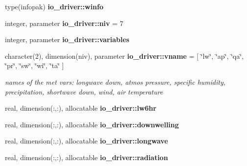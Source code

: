 \begin{DoxyCompactItemize}
\item 
\hypertarget{namespaceio__driver_af047ea740ca0d848d153f630afa40bda}{}type(infopak) {\bfseries io\+\_\+driver\+::winfo}\label{namespaceio__driver_af047ea740ca0d848d153f630afa40bda}

\item 
\hypertarget{namespaceio__driver_a7973cc9e7cf23e47964781a0f9e52b88}{}integer, parameter {\bfseries io\+\_\+driver\+::niv} = 7\label{namespaceio__driver_a7973cc9e7cf23e47964781a0f9e52b88}

\item 
\hypertarget{namespaceio__driver_a6675c2a9dae923a29212739c61645567}{}integer, parameter {\bfseries io\+\_\+driver\+::variables}\label{namespaceio__driver_a6675c2a9dae923a29212739c61645567}

\item 
\hypertarget{namespaceio__driver_ae1fa7fda7cfcbaf606b2dbd14a06f41c}{}character(2), dimension(niv), parameter {\bfseries io\+\_\+driver\+::vname} = \mbox{[} \char`\"{}lw\char`\"{}, \char`\"{}ap\char`\"{}, \char`\"{}qa\char`\"{}, \char`\"{}pr\char`\"{}, \char`\"{}sw\char`\"{}, \char`\"{}wi\char`\"{}, \char`\"{}ta\char`\"{} \mbox{]}\label{namespaceio__driver_ae1fa7fda7cfcbaf606b2dbd14a06f41c}

\begin{DoxyCompactList}\small\item\em names of the met vars\+: longwave down, atmos pressure, specific humidity, precipitation, shortwave down, wind, air temperature \end{DoxyCompactList}\item 
\hypertarget{namespaceio__driver_ac5475b80a0a6d230c6261122649216c7}{}real, dimension(\+:,\+:), allocatable {\bfseries io\+\_\+driver\+::lw6hr}\label{namespaceio__driver_ac5475b80a0a6d230c6261122649216c7}

\item 
\hypertarget{namespaceio__driver_a82106d7c42ea9e188344ebe4e1d22eb4}{}real, dimension(\+:,\+:), allocatable {\bfseries io\+\_\+driver\+::downwelling}\label{namespaceio__driver_a82106d7c42ea9e188344ebe4e1d22eb4}

\item 
\hypertarget{namespaceio__driver_a1c99cd38fb51a2e6f0749107a68d2270}{}real, dimension(\+:,\+:), allocatable {\bfseries io\+\_\+driver\+::longwave}\label{namespaceio__driver_a1c99cd38fb51a2e6f0749107a68d2270}

\item 
\hypertarget{namespaceio__driver_a9096efa40412e64f96a598629d2dd224}{}real, dimension(\+:,\+:), allocatable {\bfseries io\+\_\+driver\+::radiation}\label{namespaceio__driver_a9096efa40412e64f96a598629d2dd224}


\end{DoxyCompactItemize}
